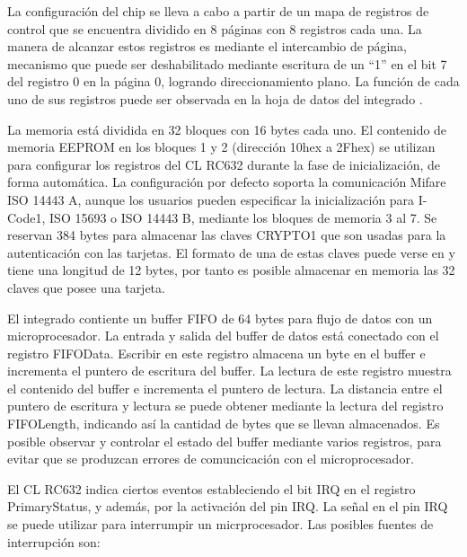 \bigskip
{}\label{Registros}

La configuración del chip se lleva a cabo a partir de un mapa de registros de control que se encuentra dividido en 8 páginas con 8 registros cada una. La manera de alcanzar estos registros es mediante el intercambio de página, mecanismo que puede ser deshabilitado mediante escritura de un “1” en el bit 7 del registro 0 en la página 0, logrando direccionamiento plano. La función de cada uno de sus registros puede ser observada en la hoja de datos del integrado \cite{RC632}.

\bigskip
{}

La memoria está dividida en 32 bloques con 16 bytes cada uno.
El contenido de memoria EEPROM en los bloques 1 y 2 (dirección 10hex a 2Fhex) se utilizan para configurar los registros del CL RC632 durante la fase de inicialización, de forma automática.
La configuración por defecto soporta la comunicación Mifare ISO 14443 A, aunque los usuarios pueden especificar la inicialización para I-Code1, ISO 15693 o ISO 14443 B, mediante los bloques de memoria 3 al 7.
Se reservan 384 bytes para almacenar las claves CRYPTO1 que son usadas para la autenticación con las tarjetas. El formato de una de estas claves puede verse en \cite{RC632} y tiene una longitud de 12 bytes, por tanto es posible almacenar en memoria las 32 claves que posee una tarjeta.

\bigskip
{}

El integrado contiente un buffer FIFO de 64 bytes para flujo de datos con un microprocesador.
La entrada y salida del buffer de datos está conectado con el registro FIFOData. Escribir en este registro almacena un byte en el buffer e incrementa el puntero de escritura del buffer. La lectura de este registro muestra el contenido del buffer e incrementa el puntero de lectura. La distancia entre el puntero de escritura y lectura se puede obtener mediante la lectura del registro FIFOLength, indicando así la cantidad de bytes que se llevan almacenados. Es posible observar y controlar el estado del buffer mediante varios registros, para evitar que se produzcan errores de comuncicación con el microprocesador.

\bigskip
{}

El CL RC632 indica ciertos eventos estableciendo el bit IRQ en el registro PrimaryStatus, y además, por la activación del pin IRQ. La señal en el pin IRQ se puede utilizar para interrumpir un micrprocesador. 
Las posibles fuentes de interrupción son: 

